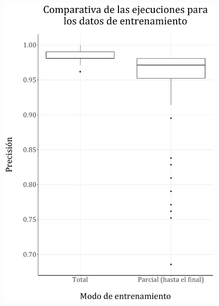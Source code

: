 \documentclass[spanish,a4paper,12pt,twoside]{report}
\begin{document}
  \begin{figure}[H]
    \begin{minipage}{0.49\textwidth}
      \centering
      \includegraphics[width = 1\linewidth]{resources/Fig20_1.pdf}
    \end{minipage}
    \begin{minipage}{0.49\textwidth}
      \centering

\end{minipage}
\end{figure}
\end{document}
